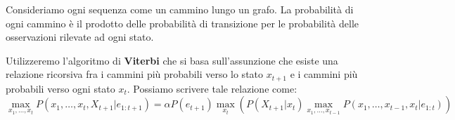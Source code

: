 \begin{itemize}
          Consideriamo ogni sequenza come un cammino lungo un grafo. La probabilità
          di ogni cammino è il prodotto delle probabilità di transizione per le
          probabilità delle osservazioni rilevate ad ogni stato.

          Utilizzeremo l'algoritmo di \textbf{Viterbi} che si basa sull'assunzione
          che esiste una relazione ricorsiva fra i cammini più probabili verso
          lo stato $x_{t+1}$ e i cammini più probabili verso ogni stato $x_t$.
          Possiamo scrivere tale relazione come:
          \begin{equation}
              \max _{x_1,\dots, x_t} P(x_1,\dots,x_t,X_{t+1}|e_{1:t+1}) = \alpha
              P(e_{t+1})\max_{x_t} \left(P(X_{t+1}|x_t)\max_{x_1,\dots,x_{t-1}}
              P(x_1,\dots,x_{t-1},x_t|e_{1:t})\right)
          \end{equation}
\end{itemize}
